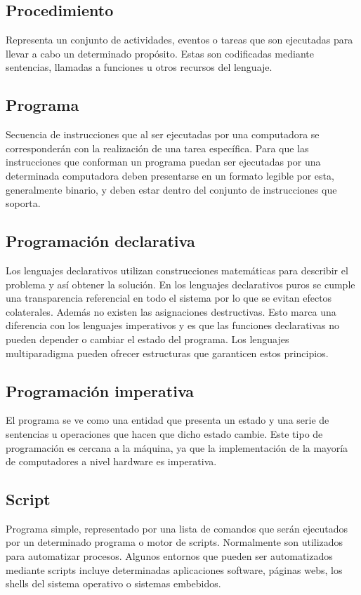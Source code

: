\subsection{Procedimiento}
Representa un conjunto de actividades, eventos o tareas que son ejecutadas para llevar a cabo un determinado propósito. Estas son codificadas mediante sentencias, llamadas a funciones
u otros recursos del lenguaje. \\

\subsection{Programa}
Secuencia de instrucciones que al ser ejecutadas por una computadora se corresponderán con
la realización de una tarea específica. Para que las instrucciones que conforman un programa puedan ser ejecutadas 
por una determinada computadora deben presentarse en un formato legible por esta, generalmente binario, y deben estar dentro
del conjunto de instrucciones que soporta. \\

\subsection {Programación declarativa}
Los lenguajes declarativos utilizan construcciones matemáticas para describir el problema y así obtener la solución.  
En los lenguajes declarativos puros se cumple una transparencia referencial en todo el sistema por lo
que se evitan efectos colaterales. Además no existen las asignaciones destructivas. Esto marca una diferencia 
con los lenguajes imperativos y es que las funciones declarativas no pueden depender o cambiar el estado del 
programa. Los lenguajes multiparadigma pueden ofrecer estructuras que garanticen estos principios.\\

\subsection {Programación imperativa}
El programa se ve como una entidad que presenta un estado y una serie de sentencias u operaciones que hacen que dicho estado cambie. Este tipo de programación es cercana a la 
máquina, ya que la implementación de la mayoría de computadores a nivel hardware es imperativa. \\

\subsection{Script}
Programa simple, representado por una lista de comandos que serán ejecutados por un determinado programa o motor de scripts. Normalmente son utilizados
para automatizar procesos. Algunos entornos que pueden ser automatizados mediante scripts incluye 
determinadas aplicaciones software, páginas webs, los shells del sistema operativo o sistemas embebidos.\\

